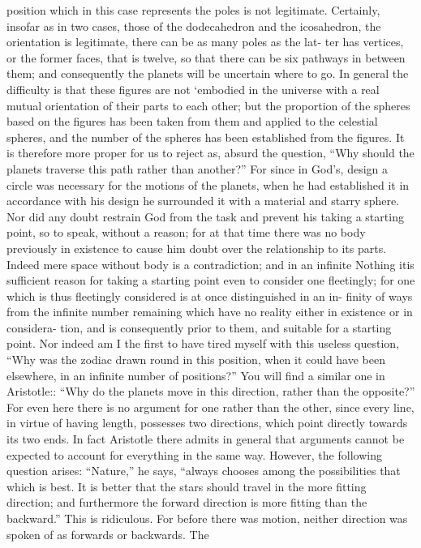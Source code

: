 \documentclass{article}
\begin{document}
{{{{{{{{{{{{{{{{{{{{{{{{{{{{{{{{{{{{{{{{{{{{{{{{{{{{{{{{{{{{{{{{{{{{{{{{{{{{{position which in this case represents the poles is not legitimate. Certainly, insofar as in two cases, those of
the dodecahedron and the icosahedron, the orientation is legitimate, there can be as many poles as the lat-
ter has vertices, or the former faces, that is twelve, so that there can be six pathways in between them; and
consequently the planets will be uncertain where to go. In general the difficulty is that these figures are not
‘embodied in the universe with a real mutual orientation of their parts to each other; but the proportion of
the spheres based on the figures has been taken from them and applied to the celestial spheres, and the
number of the spheres has been established from the figures. It is therefore more proper for us to reject as,
absurd the question, “Why should the planets traverse this path rather than another?” For since in God's,
design a circle was necessary for the motions of the planets, when he had established it in accordance with
his design he surrounded it with a material and starry sphere. Nor did any doubt restrain God from the
task and prevent his taking a starting point, so to speak, without a reason; for at that time there was no
body previously in existence to cause him doubt over the relationship to its parts. Indeed mere space
without body is a contradiction; and in an infinite Nothing itis sufficient reason for taking a starting point
even to consider one fleetingly; for one which is thus fleetingly considered is at once distinguished in an in-
finity of ways from the infinite number remaining which have no reality either in existence or in considera-
tion, and is consequently prior to them, and suitable for a starting point. Nor indeed am I the first to have
tired myself with this useless question, “Why was the zodiac drawn round in this position, when it could
have been elsewhere, in an infinite number of positions?” You will find a similar one in Aristotle:: “Why
do the planets move in this direction, rather than the opposite?” For even here there is no argument for one
rather than the other, since every line, in virtue of having length, possesses two directions, which point
directly towards its two ends. In fact Aristotle there admits in general that arguments cannot be expected
to account for everything in the same way. However, the following question arises: “Nature,” he says,
“always chooses among the possibilities that which is best. It is better that the stars should travel in the
more fitting direction; and furthermore the forward direction is more fitting than the backward.” This is
ridiculous. For before there was motion, neither direction was spoken of as forwards or backwards. The
}}}}}}}}}}}}}}}}}}}}}}}}}}}}}}}}}}}}}}}}}}}}}}}}}}}}}}}}}}}}}}}}}}}}}}}}}}}}}
\end{document}
